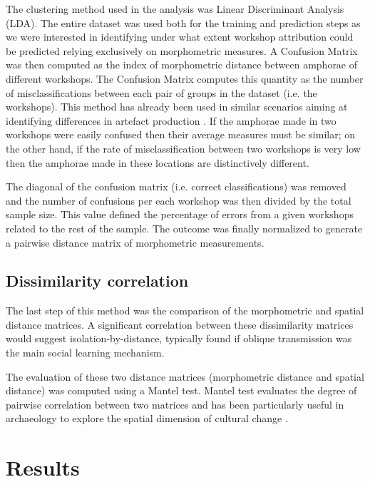 \documentclass[review]{elsarticle}
\begin{document}
The clustering method used in the analysis was Linear Discriminant Analysis (LDA). The entire dataset was used both for the training and prediction steps as we were interested in identifying under what extent workshop attribution could be predicted relying exclusively on morphometric measures. A Confusion Matrix was then computed as the index of morphometric distance between amphorae of different workshops. The Confusion Matrix computes this quantity as the number of misclassifications between each pair of groups in the dataset (i.e. the workshops). This method has already been used in similar scenarios aiming at identifying differences in artefact production \citep{thorpe_distribution_1984,i_martin_alisis_1998,charlton_investigating_2012}. If the amphorae made in two workshops were easily confused then their average measures must be similar; on the other hand, if the rate of misclassification between two workshops is very low then the amphorae made in these locations are distinctively different.

The diagonal of the confusion matrix (i.e. correct classifications) was removed and the number of confusions per each workshop was then divided by the total sample size. This value defined the percentage of errors from a given workshops related to the rest of the sample. The outcome was finally normalized to generate a pairwise distance matrix of morphometric measurements.

\subsection{Dissimilarity correlation}

The last step of this method was the comparison of the morphometric and spatial distance matrices. A significant correlation between these dissimilarity matrices would suggest isolation-by-distance, typically found if oblique transmission was the main social learning mechanism.

The evaluation of these two distance matrices (morphometric distance and spatial distance) was computed using a Mantel test. Mantel test evaluates the degree of pairwise correlation between two matrices and has been particularly useful in archaeology to explore the spatial dimension of cultural change \citep{mantel_detection_1967, diniz-filho_mantel_2013, crema_culture_2014}.  

\section{Results}
\end{document}
